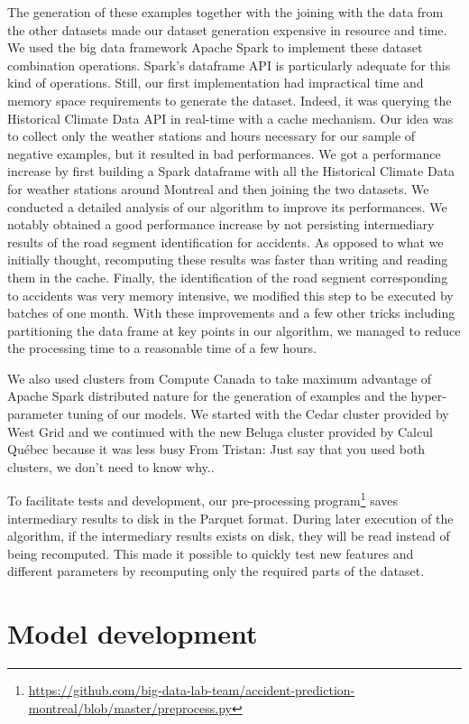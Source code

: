 \documentclass[conference]{IEEEtran}
\newcommand{\TG}[1]{\colorlet{saved}{.}\color{orange}From Tristan: #1\color{saved}}
\begin{document}
The generation of these examples together with the
joining with the data from the other datasets made our dataset
generation expensive in resource and time. We used the big data framework
Apache Spark \cite{Zaharia2016} to implement these dataset combination
operations. Spark's dataframe API is particularly adequate
for this kind of operations. Still, our first implementation had impractical
time and memory space requirements to generate the dataset. Indeed, it was querying
the Historical Climate Data API in real-time with a cache mechanism. Our
idea was to collect only the weather stations and hours necessary for our
sample of negative examples, but it resulted in bad performances. We got a
performance increase by first building a Spark dataframe with all the
Historical Climate Data for weather stations around Montreal and then
joining the two datasets. We conducted a detailed analysis of our algorithm
to improve its performances. We notably obtained a good performance
increase by not persisting intermediary results of the road segment
identification for accidents. As opposed to what we initially thought,
recomputing these results was faster than writing and reading them in the
cache. Finally, the identification of the road segment corresponding to
accidents was very memory intensive, we modified this step to be executed
by batches of one month. With these improvements and a few other tricks
including partitioning the data frame at key points in our algorithm, we
managed to reduce the processing time to a reasonable time of a few hours.

We also used clusters from Compute Canada to take maximum advantage of Apache Spark distributed nature for the generation of examples and the hyper-parameter tuning of our models. We started with the Cedar cluster provided by West Grid and we continued with the new Beluga cluster provided by Calcul Québec because it was less busy \TG{Just say that you used both clusters, we don't need to know why.}.

To facilitate tests and development, our pre-processing program\footnote{\url{https://github.com/big-data-lab-team/accident-prediction-montreal/blob/master/preprocess.py}} saves intermediary results to disk in the Parquet format. During later execution of the algorithm, if the intermediary results exists on disk, they will be read instead of being recomputed. This made it possible to quickly test new features and different parameters by recomputing only the required parts of the dataset.

\section{Model development}
\end{document}
